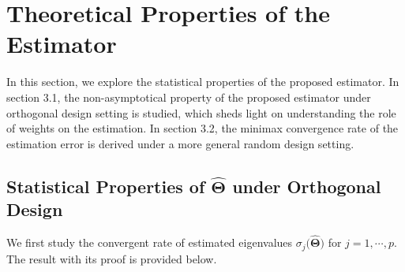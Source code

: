 \documentclass[12pt]{article}
\begin{document}
\section{Theoretical Properties of the Estimator}
In this section, we explore the statistical properties of the proposed estimator. 
In section 3.1, the non-asymptotical property of the proposed estimator under orthogonal design setting is studied, which sheds light on understanding the role of weights on the estimation. In section 3.2, the minimax convergence rate of the estimation error is derived under a more general random design setting.

\subsection{Statistical Properties of $\widehat{\boldsymbol{\Theta}}$ under Orthogonal Design}
We first study the convergent rate of estimated eigenvalues $\sigma_{j}\big(\widehat{\boldsymbol{\Theta}}\big)$ for $j = 1, \cdots, p$. 
The result with its proof is provided below.
\end{document}
